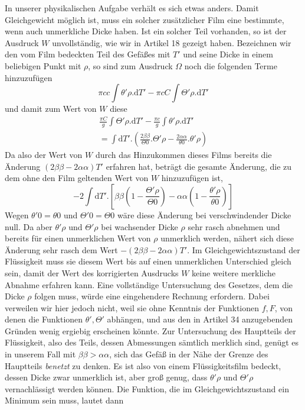 In unserer physikalischen Aufgabe verhält es sich etwas anders. Damit Gleichgewicht möglich ist, muss ein solcher zusätzlicher Film eine bestimmte, wenn auch unmerkliche Dicke haben. Ist ein solcher Teil vorhanden, so ist der Ausdruck $W$ unvollständig, wie wir in Artikel 18 gezeigt haben. Bezeichnen wir den vom Film bedeckten Teil des Gefäßes mit $T'$
und seine Dicke in einem beliebigen Punkt mit $\rho$, so sind zum Ausdruck $\Omega$ noch die folgenden Terme hinzuzufügen
\[
\pi cc\int\theta'\rho.\mathrm{d}T'-\pi cC\int\Theta'\rho.\mathrm{d}T'
\]
und damit zum Wert von $W$ diese
\[
\begin{gathered}
\frac{\pi C}g\int\Theta'\rho.\mathrm{d}T'-\frac{\pi c}g\int\theta'\rho.\mathrm{d}T'\\
=\int\mathrm{d}T'.\left(\frac{2\beta\beta}{\Theta0}.\Theta'\rho-\frac{2\alpha\alpha}{\theta0}.\theta'\rho\right)
\end{gathered}
\]
Da also der Wert von $W$ durch das Hinzukommen dieses Films bereits die Änderung $(2\beta\beta-2\alpha\alpha)T'$ erfahren hat, beträgt die gesamte Änderung, die zu dem ohne den Film geltenden Wert von $W$ hinzuzufügen ist,
\[
-2\int\mathrm{d}T'.\left[\beta\beta\left(1-\frac{\Theta'\rho}{\Theta0}\right)-\alpha\alpha\left(1-\frac{\theta'\rho}{\theta0}\right)\right]
\]
Wegen $\theta'0=\theta0$ und $\Theta'0=\Theta0$ wäre diese Änderung bei verschwindender Dicke null. Da aber $\theta'\rho$ und $\Theta'\rho$ bei wachsender Dicke $\rho$ sehr rasch abnehmen und bereits für einen unmerklichen Wert von $\rho$ unmerklich werden, nähert sich diese Änderung sehr rasch dem Wert $-(2\beta\beta-2\alpha\alpha)T'$. Im Gleichgewichtszustand der Flüssigkeit muss sie diesem Wert bis auf einen unmerklichen Unterschied gleich sein, damit der Wert des korrigierten Ausdrucks $W$ keine weitere merkliche Abnahme erfahren kann. Eine vollständige Untersuchung des Gesetzes, dem die Dicke $\rho$ folgen muss, würde eine eingehendere Rechnung erfordern. Dabei verweilen wir hier jedoch nicht, weil sie ohne Kenntnis der Funktionen $f,F$, von denen die Funktionen $\theta',\Theta'$ abhängen, und aus den in Artikel 34 anzugebenden Gründen wenig ergiebig erscheinen könnte. Zur Untersuchung des Hauptteils der Flüssigkeit, also des Teils, dessen Abmessungen sämtlich merklich sind, genügt es in unserem Fall mit $\beta\beta>\alpha\alpha$, sich das Gefäß in der Nähe der Grenze des Hauptteils \textit{benetzt} zu denken. Es ist also von einem Flüssigkeitsfilm bedeckt, dessen Dicke zwar unmerklich ist, aber groß genug, dass $\theta'\rho$ und $\Theta'\rho$ vernachlässigt werden können. Die Funktion, die im Gleichgewichtszustand ein Minimum sein muss, lautet dann
